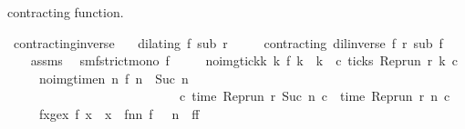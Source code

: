\begin{isabellebody}
\begin{isamarkuptext}
  contracting function.%
\end{isamarkuptext}\isamarkuptrue%
\isamarkupfalse%
\ contracting{\isacharunderscore}inverse{\isacharcolon}\isanewline
\ \ \ {\isacartoucheopen}dilating\ f\ sub\ r{\isacartoucheclose}\isanewline
\ \ \ \ \ {\isacartoucheopen}contracting\ {\isacharparenleft}dil{\isacharunderscore}inverse\ f{\isacharparenright}\ r\ sub\ f{\isacartoucheclose}\isanewline
%
\isadelimproof
%
\endisadelimproof
%
\isatagproof
{}\isamarkupfalse%
\ {\isacharminus}\isanewline
\ \ \isamarkupfalse%
\ assms\ \isamarkupfalse%
\ smf{\isacharcolon}{\isacartoucheopen}strict{\isacharunderscore}mono\ f{\isacartoucheclose}\isanewline
\ \ \ \ \ no{\isacharunderscore}img{\isacharunderscore}tick{\isacharcolon}{\isacartoucheopen}{\isasymforall}k{\isachardot}\ {\isacharparenleft}{\isasymnexists}k\ f\ k\ {\isacharequal}\ k{\isacharparenright}\ {\isasymlongrightarrow}\ {\isacharparenleft}{\isasymforall}c{\isachardot}\ {\isasymnot}{\isacharparenleft}ticks\ {\isacharparenleft}{\isacharparenleft}Rep{\isacharunderscore}run\ r{\isacharparenright}\ k\ c{\isacharparenright}{\isacharparenright}{\isacharparenright}{\isacartoucheclose}\isanewline
\ \ \ \ \ no{\isacharunderscore}img{\isacharunderscore}time{\isacharcolon}{\isacartoucheopen}{\isasymAnd}n{\isachardot}\ {\isacharparenleft}{\isasymnexists}n\ f\ n\ {\isacharequal}\ {\isacharparenleft}Suc\ n{\isacharparenright}{\isacharparenright}\isanewline
\ \ \ \ \ \ \ \ \ \ \ \ \ \ \ \ \ \ \ \ \ \ \ \ \ \ {\isasymlongrightarrow}\ {\isacharparenleft}{\isasymforall}c{\isachardot}\ time\ {\isacharparenleft}{\isacharparenleft}Rep{\isacharunderscore}run\ r{\isacharparenright}\ {\isacharparenleft}Suc\ n{\isacharparenright}\ c{\isacharparenright}\ {\isacharequal}\ time\ {\isacharparenleft}{\isacharparenleft}Rep{\isacharunderscore}run\ r{\isacharparenright}\ n\ c{\isacharparenright}{\isacharparenright}{\isacartoucheclose}\isanewline
\ \ \ \ \ fxge{\isacharcolon}{\isacartoucheopen}{\isasymforall}x{\isachardot}\ f\ x\ {\isasymge}\ x{\isacartoucheclose}\ \ f{}n{\isacharcolon}{\isacartoucheopen}{\isasymAnd}n{\isachardot}\ f\ {}\ {\isasymle}\ n{\isacartoucheclose}\ \ f{}{\isacharcolon}{\isacartoucheopen}f\ {}\ {\isacharequal}\ {}{\isacartoucheclose}\isanewline

\end{isabellebody}
